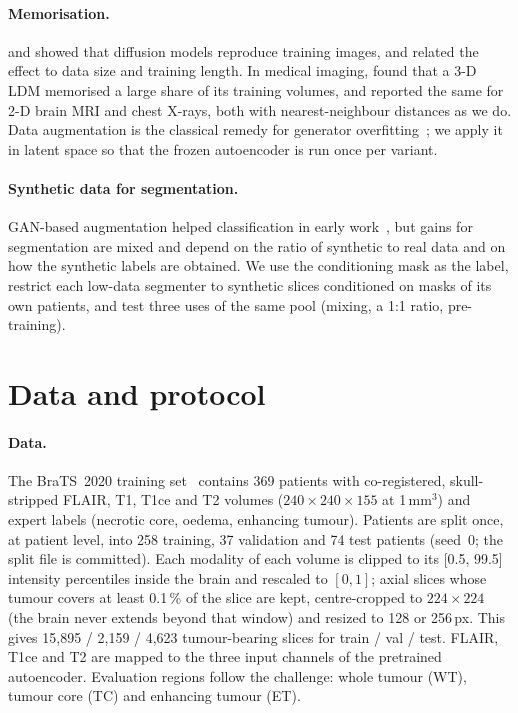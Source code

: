 \documentclass[10pt,a4paper]{article}
\begin{document}
\paragraph{Memorisation.} \citet{carlini2023extracting} and \citet{somepalli2023forgery} showed that diffusion models reproduce training images, and \citet{gu2023memorization} related the effect to data size and training length. In medical imaging, \citet{dar2023memorization} found that a 3-D LDM memorised a large share of its training volumes, and \citet{akbar2023beware} reported the same for 2-D brain MRI and chest X-rays, both with nearest-neighbour distances as we do. Data augmentation is the classical remedy for generator overfitting~\citep{karras2020ada}; we apply it in latent space so that the frozen autoencoder is run once per variant.

\paragraph{Synthetic data for segmentation.} GAN-based augmentation helped classification in early work~\citep{fridadar2018gan}, but gains for segmentation are mixed and depend on the ratio of synthetic to real data and on how the synthetic labels are obtained. We use the conditioning mask as the label, restrict each low-data segmenter to synthetic slices conditioned on masks of its own patients, and test three uses of the same pool (mixing, a 1:1 ratio, pre-training).

\section{Data and protocol}
\label{sec:data}
\paragraph{Data.} The BraTS~2020 training set~\citep{menze2015brats,bakas2017data,bakas2018challenge} contains 369 patients with co-registered, skull-stripped FLAIR, T1, T1ce and T2 volumes ($240\times240\times155$ at 1\,mm$^3$) and expert labels (necrotic core, oedema, enhancing tumour). Patients are split once, at patient level, into 258 training, 37 validation and 74 test patients (seed~0; the split file is committed). Each modality of each volume is clipped to its [0.5, 99.5] intensity percentiles inside the brain and rescaled to $[0,1]$; axial slices whose tumour covers at least 0.1\,\% of the slice are kept, centre-cropped to $224\times224$ (the brain never extends beyond that window) and resized to 128 or 256\,px. This gives 15,895 / 2,159 / 4,623 tumour-bearing slices for train / val / test. FLAIR, T1ce and T2 are mapped to the three input channels of the pretrained autoencoder. Evaluation regions follow the challenge: whole tumour (WT), tumour core (TC) and enhancing tumour (ET).
\end{document}
